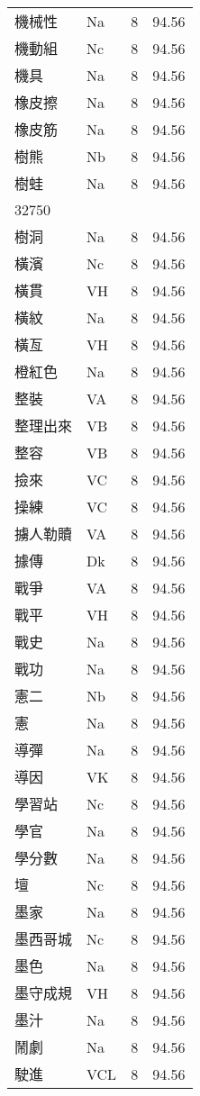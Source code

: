 \documentclass[twocolumn]{book}
\begin{document}
\begin{supertabular}{llrr}
機械性 & Na & 8 &  94.56\\
機動組 & Nc & 8 &  94.56\\
機具 & Na & 8 &  94.56\\
橡皮擦 & Na & 8 &  94.56\\
橡皮筋 & Na & 8 &  94.56\\
樹熊 & Nb & 8 &  94.56\\
樹蛙 & Na & 8 &  94.56\\
32750\\
樹洞 & Na & 8 &  94.56\\
橫濱 & Nc & 8 &  94.56\\
橫貫 & VH & 8 &  94.56\\
橫紋 & Na & 8 &  94.56\\
橫亙 & VH & 8 &  94.56\\
橙紅色 & Na & 8 &  94.56\\
整裝 & VA & 8 &  94.56\\
整理出來 & VB & 8 &  94.56\\
整容 & VB & 8 &  94.56\\
撿來 & VC & 8 &  94.56\\
操練 & VC & 8 &  94.56\\
擄人勒贖 & VA & 8 &  94.56\\
據傳 & Dk & 8 &  94.56\\
戰爭 & VA & 8 &  94.56\\
戰平 & VH & 8 &  94.56\\
戰史 & Na & 8 &  94.56\\
戰功 & Na & 8 &  94.56\\
憲二 & Nb & 8 &  94.56\\
憲 & Na & 8 &  94.56\\
導彈 & Na & 8 &  94.56\\
導因 & VK & 8 &  94.56\\
學習站 & Nc & 8 &  94.56\\
學官 & Na & 8 &  94.56\\
學分數 & Na & 8 &  94.56\\
壇 & Nc & 8 &  94.56\\
墨家 & Na & 8 &  94.56\\
墨西哥城 & Nc & 8 &  94.56\\
墨色 & Na & 8 &  94.56\\
墨守成規 & VH & 8 &  94.56\\
墨汁 & Na & 8 &  94.56\\
鬧劇 & Na & 8 &  94.56\\
駛進 & VCL & 8 &  94.56\\

\end{supertabular}
\end{document}
